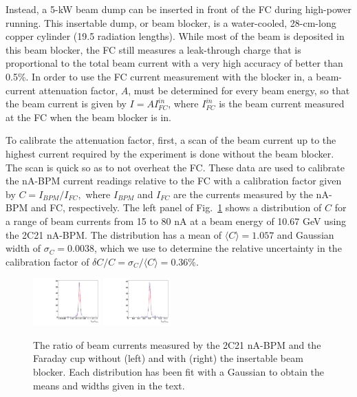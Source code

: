 Instead, a 5-kW beam dump can be inserted in front of the FC during high-power running. This insertable dump, or beam blocker, is a 
water-cooled, 28-cm-long copper cylinder (19.5 radiation lengths).   While most of the beam is deposited in this beam blocker, the FC 
still measures a leak-through charge that is proportional to the total beam current with a very high accuracy of better than 0.5\%. 
In order to use the FC current measurement with the blocker in, a beam-current attenuation factor, $A$, must be determined for every 
beam energy, so that the beam current is given by $I=A I_{FC}^{in}$, where $I_{FC}^{in}$ is the beam current measured at the FC when the
beam blocker is in. 

To calibrate the attenuation factor, first, a scan of the beam current up to the highest current required by the experiment is done 
without the beam blocker. The scan is quick so as to not overheat the FC.  These data are used to calibrate the nA-BPM current readings 
relative to the FC with a calibration factor given by $C={I_{BPM}}/{I_{FC}},$
where $I_{BPM}$ and $I_{FC}$ are the currents measured by the nA-BPM and FC, respectively. The left panel of Fig.~\ref{fig:2c21fc} 
shows a distribution of $C$ for a range of beam currents from 15 to 80 nA at a beam energy of 10.67 GeV using the 2C21 nA-BPM.
The distribution has a mean of $\langle C\rangle=1.057$ and Gaussian width of $\sigma_C=0.0038$, which we use to determine 
the relative uncertainty in the calibration factor of $\delta C/C=\sigma_C/\langle C\rangle=0.36$\%.
 
\begin{figure}[ht]
\begin{center}
\includegraphics[width=0.23\textwidth]{fCup_2C21_ratio_highcurr.pdf}
\includegraphics[width=0.23\textwidth]{BB_attenuation_2c21_highcurr.pdf}
\caption{The ratio of beam currents measured by the 2C21 nA-BPM and the Faraday cup without (left) and with (right)  the insertable beam
 blocker. Each distribution has been fit with a Gaussian to obtain the means and widths given in the text.}
\label{fig:2c21fc}
\end{center}
\end{figure}

